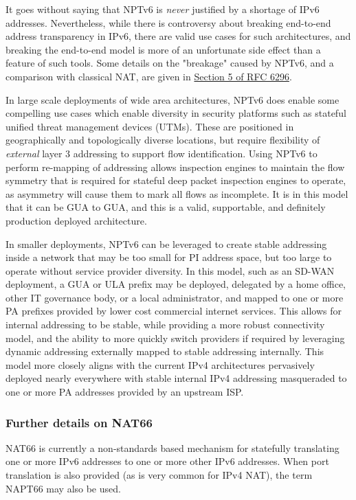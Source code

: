 \documentclass[
]{article}
\begin{document}
It goes without saying that NPTv6 is \emph{never} justified by a
shortage of IPv6 addresses. Nevertheless, while there is controversy
about breaking end-to-end address transparency in IPv6, there are valid
use cases for such architectures, and breaking the end-to-end model is
more of an unfortunate side effect than a feature of such tools. Some
details on the "breakage" caused by NPTv6, and a comparison with
classical NAT, are given in
\href{https://www.rfc-editor.org/rfc/rfc6296.html\#section-5}{Section 5
of RFC 6296}.

In large scale deployments of wide area architectures, NPTv6 does enable
some compelling use cases which enable diversity in security platforms
such as stateful unified threat management devices (UTMs). These are
positioned in geographically and topologically diverse locations, but
require flexibility of \emph{external} layer 3 addressing to support
flow identification. Using NPTv6 to perform re-mapping of addressing
allows inspection engines to maintain the flow symmetry that is required
for stateful deep packet inspection engines to operate, as asymmetry
will cause them to mark all flows as incomplete. It is in this model
that it can be GUA to GUA, and this is a valid, supportable, and
definitely production deployed architecture.

In smaller deployments, NPTv6 can be leveraged to create stable
addressing inside a network that may be too small for PI address space,
but too large to operate without service provider diversity. In this
model, such as an SD-WAN deployment, a GUA or ULA prefix may be
deployed, delegated by a home office, other IT governance body, or a
local administrator, and mapped to one or more PA prefixes provided by
lower cost commercial internet services. This allows for internal
addressing to be stable, while providing a more robust connectivity
model, and the ability to more quickly switch providers if required by
leveraging dynamic addressing externally mapped to stable addressing
internally. This model more closely aligns with the current IPv4
architectures pervasively deployed nearly everywhere with stable
internal IPv4 addressing masqueraded to one or more PA addresses
provided by an upstream ISP.

\subsubsection{Further details on NAT66}\label{further-details-on-nat66}

NAT66 is currently a non-standards based mechanism for statefully
translating one or more IPv6 addresses to one or more other IPv6
addresses. When port translation is also provided (as is very common for
IPv4 NAT), the term NAPT66 may also be used.
\end{document}
